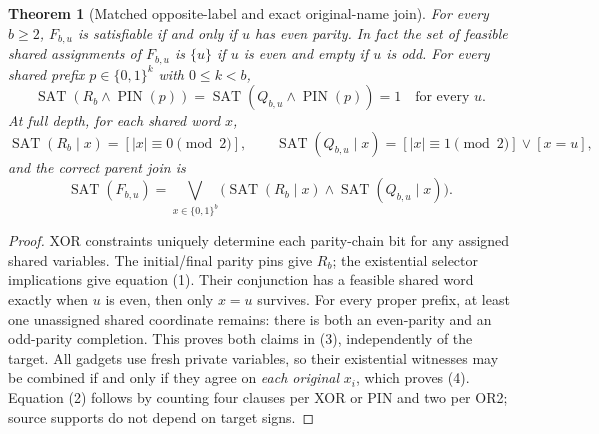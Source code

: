\documentclass[11pt]{article}
\newtheorem{theorem}{Theorem}
\newcommand{\SAT}{\operatorname{SAT}}
\begin{document}
\begin{theorem}[Matched opposite-label and exact original-name join]
For every $b\ge2$, $F_{b,u}$ is satisfiable if and only if $u$ has even
parity. In fact the set of feasible shared assignments of $F_{b,u}$
is $\{u\}$ if $u$ is even and empty if $u$ is odd. For every shared
prefix $p\in\{0,1\}^k$ with $0\le k<b$,
\[
 \SAT(R_b\wedge\operatorname{PIN}(p))=
 \SAT(Q_{b,u}\wedge\operatorname{PIN}(p))=1
 \quad\text{for every }u.
 \tag{3}
\]
At full depth, for each shared word $x$,
\[
 \SAT(R_b\mid x)=[|x|\equiv0\pmod2],\qquad
 \SAT(Q_{b,u}\mid x)=[|x|\equiv1\pmod2]\vee[x=u],
\]
and the \emph{correct} parent join is
\[
 \SAT(F_{b,u})
 =\bigvee_{x\in\{0,1\}^b}
  \bigl(\SAT(R_b\mid x)\wedge\SAT(Q_{b,u}\mid x)\bigr).
 \tag{4}
\]
\end{theorem}
\begin{proof}
XOR constraints uniquely determine each parity-chain bit for any assigned
shared variables. The initial/final parity pins give $R_b$; the existential
selector implications give equation (1). Their conjunction has a feasible
shared word exactly when $u$ is even, then only $x=u$ survives.
For every proper prefix, at least one unassigned shared coordinate remains:
there is both an even-parity and an odd-parity completion. This proves
both claims in (3), independently of the target. All gadgets use fresh
private variables, so their existential witnesses may be combined if and
only if they agree on \emph{each original} $x_i$, which proves (4).
Equation (2) follows by counting four clauses per XOR or PIN and two
per OR2; source supports do not depend on target signs.
\end{proof}
\end{document}
